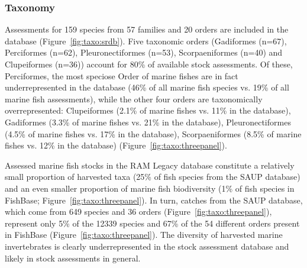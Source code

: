 
\subsubsection*{Taxonomy}

Assessments for 159 species from
57 families and 20
orders are included in the database (Figure~\ref{fig:taxo:srdb}). Five
taxonomic orders (Gadiformes (n=67),
Perciformes (n=62), Pleuronectiformes (n=53),
Scorpaeniformes (n=40) and Clupeiformes (n=36)) account for
80\% of available stock assessments.  Of these, Perciformes, the most
speciose Order of marine fishes are in fact underrepresented in the
database (46\% of all marine fish species vs.  19\% of all marine
fish assessments), while the other four orders are
taxonomically overrepresented: Clupeiformes (2.1\% of marine fishes
vs.  11\% in the database), Gadiformes (3.3\% of marine fishes vs.
21\% in the database), Pleuronectiformes (4.5\% of marine fishes vs.
17\% in the database), Scorpaeniformes (8.5\% of marine fishes vs.
12\% in the database) (Figure~\ref{fig:taxo:threepanel}).

Assessed marine fish stocks in the RAM Legacy database constitute a
relatively small proportion of harvested taxa
(25\% of fish species from the SAUP database)
and an even smaller proportion of marine fish biodiversity
(1\% of fish species in FishBase;
Figure~\ref{fig:taxo:threepanel}). In turn, catches from the SAUP
database, which come from 649 species and
36 orders (Figure~\ref{fig:taxo:threepanel}),
represent only 5\% of the
12339 species and 67\%
of the 54 different orders present in FishBase
(Figure~\ref{fig:taxo:threepanel}). The diversity of harvested marine
invertebrates is clearly underrepresented in the stock assessment
database and likely in stock assessments in general.




